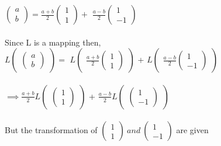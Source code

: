 \documentclass[45pt]{article}
\begin{document}
$\begin{pmatrix} a\\b \end{pmatrix} =\frac{a+b}{2} \begin{pmatrix} 1\\1 \end{pmatrix} + $
$\frac{a-b}{2} \begin{pmatrix} 1\\-1 \end{pmatrix}$\\\\
Since L is a mapping then,\\
$L\begin{pmatrix} \begin{pmatrix} a\\b \end{pmatrix} \end{pmatrix} =$
$L\begin{pmatrix} \frac{a+b}{2} \begin{pmatrix} 1\\1 \end{pmatrix} \end{pmatrix}$
+ 
$L\begin{pmatrix} \frac{a-b}{2} \begin{pmatrix} 1\\-1 \end{pmatrix} \end{pmatrix}$\\\\
$\implies \frac{a+b}{2} L\begin{pmatrix} \begin{pmatrix} 1\\1 \end{pmatrix} \end{pmatrix}$
+ 
$\frac{a-b}{2}L\begin{pmatrix}  \begin{pmatrix} 1\\-1 \end{pmatrix} \end{pmatrix}$ \\\\
But the transformation of $\begin{pmatrix} 1\\1 \end{pmatrix} ~and ~ \begin{pmatrix} 1\\-1 \end{pmatrix}$ are given\\
\end{document}
